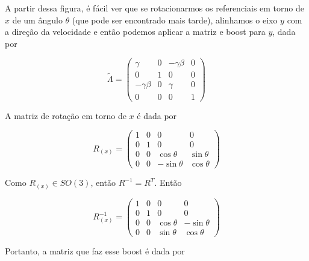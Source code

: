 \documentclass[10pt,a4paper]{article}
\begin{document}
\begin{enumerate}
	A partir dessa figura, é fácil ver que se rotacionarmos os referenciais em torno de $x$ de um ângulo $\theta$ (que pode ser encontrado mais tarde), alinhamos o eixo $y$ com a direção da velocidade e então podemos aplicar a matriz e boost para $y$, dada por 
	
\begin{equation} 
\tilde{\Lambda}=\begin{pmatrix}
\gamma & 0 & -\gamma \beta & 0 \\ 
0 & 1 & 0 & 0 \\ 
-\gamma \beta & 0 & \gamma & 0 \\ 
0 & 0 & 0 & 1
\end{pmatrix} 
\end{equation}

A matriz de rotação em torno de $x$ é dada por 

\begin{equation}
R_{(x)}=\begin{pmatrix}
1 & 0 & 0 & 0 \\ 
0 & 1 & 0 & 0 \\ 
0 & 0 & \cos\theta & \sin\theta \\ 
0 & 0 & -\sin\theta & \cos\theta
\end{pmatrix} 
\end{equation}

Como $R_{(x)} \in SO(3)$, então $R^{-1} = R^T$. Então

\begin{equation}
R_{(x)}^{-1}=\begin{pmatrix}
1 & 0 & 0 & 0 \\ 
0 & 1 & 0 & 0 \\ 
0 & 0 & \cos\theta & -\sin\theta \\ 
0 & 0 & \sin\theta & \cos\theta
\end{pmatrix} 
\end{equation}

Portanto, a matriz que faz esse boost é dada por 


\end{enumerate}
\end{document}
